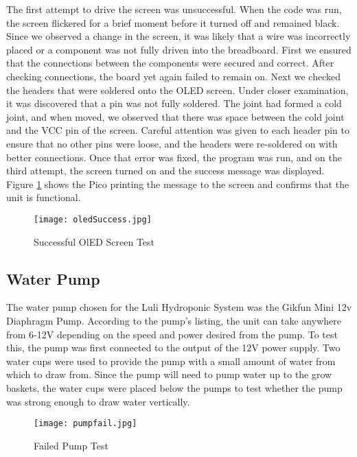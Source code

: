 \documentclass[12pt]{article} %
\begin{document}
The first attempt to drive the screen was unsuccessful. When the code was run, the screen flickered for a brief moment before it turned off and remained black. Since we observed a change in the screen, it was likely that a wire was incorrectly placed or a component was not fully driven into the breadboard. First we ensured that the connections between the components were secured and correct. After checking connections, the board yet again failed to remain on. Next we checked the headers that were soldered onto the OLED screen. Under closer examination, it was discovered that a pin was not fully soldered. The joint had formed a cold joint, and when moved, we observed that there was space between the cold joint and the VCC pin of the screen. Careful attention was given to each header pin to ensure that no other pins were loose, and the headers were re-soldered on with better connections. Once that error was fixed, the program was run, and on the third attempt, the screen turned on and the success message was displayed. Figure \ref{fig:OLED Success} shows the Pico printing the message to the screen and confirms that the unit is functional. 

\begin{figure}[H]
  \centering
  \texttt{[image: oledSuccess.jpg]}
  \caption{Successful OlED Screen Test}
  \label{fig:OLED Success}
\end{figure}


\subsection{Water Pump}

The water pump chosen for the Luli Hydroponic System was the Gikfun Mini 12v Diaphragm Pump. According to the pump's listing, the unit can take anywhere from 6-12V depending on the speed and power desired from the pump. To test this, the pump was first connected to the output of the 12V power supply. Two water cups were used to provide the pump with a small amount of water from which to draw from. Since the pump will need to pump water up to the grow baskets, the water cups were placed below the pumps to test whether the pump was strong enough to draw water vertically. 

\begin{figure}[H]
  \centering
  \texttt{[image: pumpfail.jpg]}
  \caption{Failed Pump Test}
  \label{fig:Pump Fail}
\end{figure}
\end{document}
